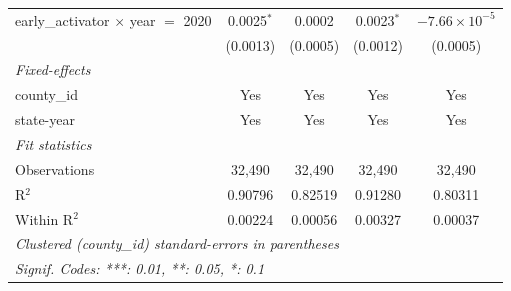 \begin{tabular}{lcccc}
   early\_activator $\times$ year $=$ 2020   & 0.0025$^{*}$       & 0.0002                    & 0.0023$^{*}$         & $-7.66\times 10^{-5}$\\    
                                             & (0.0013)           & (0.0005)                  & (0.0012)             & (0.0005)\\   
   \midrule
   \emph{Fixed-effects}\\
   county\_id                                & Yes                & Yes                       & Yes                  & Yes\\  
   state-year                                & Yes                & Yes                       & Yes                  & Yes\\  
   \midrule
   \emph{Fit statistics}\\
   Observations                              & 32,490             & 32,490                    & 32,490               & 32,490\\  
   R$^2$                                     & 0.90796            & 0.82519                   & 0.91280              & 0.80311\\  
   Within R$^2$                              & 0.00224            & 0.00056                   & 0.00327              & 0.00037\\  
   \midrule \midrule
   \multicolumn{5}{l}{\emph{Clustered (county\_id) standard-errors in parentheses}}\\
   \multicolumn{5}{l}{\emph{Signif. Codes: ***: 0.01, **: 0.05, *: 0.1}}\\
\end{tabular}
\par\endgroup



